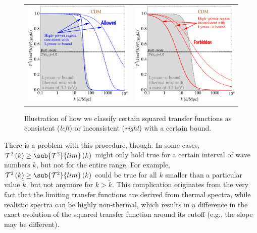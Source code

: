 \begin{figure}[t]
\begin{tabular}{lr}\hspace{-1cm}
 \includegraphics[width=8.3cm]{figures/DM_Allowed.pdf} & \includegraphics[width=8.3cm]{figures/DM_Forbidden.pdf}
\end{tabular}
\caption{\label{fig:Ly-alpha_illustration}Illustration of how we classify certain squared transfer functions as consistent (\emph{left}) or inconsistent (\emph{right}) with a certain bound.}
\end{figure}

There is a problem with this procedure, though. In some cases, $\mathcal{T}^2\left(k\right) \geq \sub{\mathcal{T}^2}{lim}\left(k\right)$ might only hold true for a certain interval of wave numbers $k$, but not for the  entire range. For example, $\mathcal{T}^2\left(k\right) \geq \sub{\mathcal{T}^2}{lim}\left(k\right)$ could be true for all $k$ smaller than a particular value $\tilde k$, but not anymore for $k > \tilde k$. This complication originates from the very fact that the limiting transfer functions are derived from thermal spectra, while realistic spectra can be highly non-thermal, which results in a difference in the exact evolution of the squared transfer function around its cutoff (e.g., the slope may be different).


